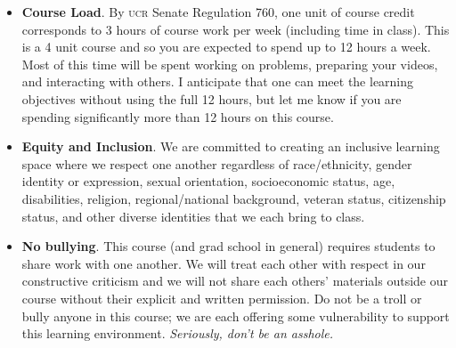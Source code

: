 \documentclass[12pt]{article}
\numberwithin{equation}{section}    %
\begin{document}
\begin{itemize}
	\item \textbf{Course Load}. By \textsc{ucr} Senate Regulation 760, one unit of course credit corresponds to 3 hours of course work per week (including time in class). This is a 4 unit course and so you are expected to spend up to 12 hours a week. Most of this time will be spent working on problems, preparing your videos, and interacting with others. I anticipate that one can meet the learning objectives without using the full 12 hours, but let me know if you are spending significantly more than 12 hours on this course.
	\item \textbf{Equity and Inclusion}. We are committed to creating an inclusive learning space where we respect one another regardless of race/ethnicity, gender identity or expression, sexual orientation, socioeconomic status, age, disabilities, religion, regional/national background, veteran status, citizenship status, and other diverse identities that we each bring to class.
	\item \textbf{No bullying}. This course (and grad school in general) requires students to share work with one another. We will treat each other with respect in our constructive criticism and we will not share each others' materials outside our course without their explicit and written permission. Do not be a troll or bully anyone in this course; we are each offering some vulnerability to support this learning environment.  \emph{Seriously, don't be an asshole.}

\end{itemize}
\end{document}
